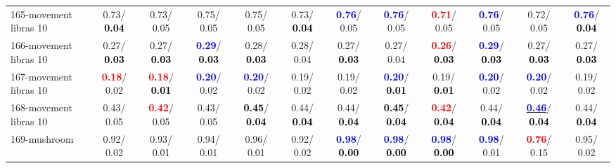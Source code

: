 \begin{table}[h]
\begin{center}
{\begin{tabular}{lc|c|c|c|c|c|c|c|c|c|c}
165-movement libras 10 &   0.73/\textcolor{black}{\textbf{  0.04}} &   0.73/  0.05 &   0.75/  0.05 &   0.75/  0.05 &   0.73/\textcolor{black}{\textbf{  0.04}} & \textcolor{blue}{\textbf{  0.76}}/  0.05 & \textcolor{blue}{\textbf{  0.76}}/  0.05 & \textcolor{red}{\textbf{  0.71}}/  0.05 & \textcolor{blue}{\textbf{  0.76}}/  0.05 &   0.72/  0.05 & \textcolor{blue}{\textbf{  0.76}}/\textcolor{black}{\textbf{  0.04}} \\
166-movement libras 10 &   0.27/\textcolor{black}{\textbf{  0.03}} &   0.27/\textcolor{black}{\textbf{  0.03}} & \textcolor{blue}{\textbf{  0.29}}/\textcolor{black}{\textbf{  0.03}} &   0.28/\textcolor{black}{\textbf{  0.03}} &   0.28/  0.04 &   0.27/\textcolor{black}{\textbf{  0.03}} &   0.27/  0.04 & \textcolor{red}{\textbf{  0.26}}/\textcolor{black}{\textbf{  0.03}} & \textcolor{blue}{\textbf{  0.29}}/\textcolor{black}{\textbf{  0.03}} &   0.27/\textcolor{black}{\textbf{  0.03}} &   0.27/\textcolor{black}{\textbf{  0.03}} \\
167-movement libras 10 & \textcolor{red}{\textbf{  0.18}}/  0.02 & \textcolor{red}{\textbf{  0.18}}/\textcolor{black}{\textbf{  0.01}} & \textcolor{blue}{\textbf{  0.20}}/  0.02 & \textcolor{blue}{\textbf{  0.20}}/  0.02 &   0.19/  0.02 &   0.19/  0.02 & \textcolor{blue}{\textbf{  0.20}}/\textcolor{black}{\textbf{  0.01}} &   0.19/\textcolor{black}{\textbf{  0.01}} & \textcolor{blue}{\textbf{  0.20}}/  0.02 & \textcolor{blue}{\textbf{  0.20}}/  0.02 &   0.19/  0.02 \\ \hline
168-movement libras 10 &   0.43/  0.05 & \textcolor{red}{\textbf{  0.42}}/  0.05 &   0.43/  0.05 & \textcolor{black}{\textbf{  0.45}}/\textcolor{black}{\textbf{  0.04}} &   0.44/\textcolor{black}{\textbf{  0.04}} &   0.44/\textcolor{black}{\textbf{  0.04}} & \textcolor{black}{\textbf{  0.45}}/\textcolor{black}{\textbf{  0.04}} & \textcolor{red}{\textbf{  0.42}}/\textcolor{black}{\textbf{  0.04}} &   0.44/\textcolor{black}{\textbf{  0.04}} & \underline{\textcolor{blue}{\textbf{  0.46}}}/\textcolor{black}{\textbf{  0.04}} &   0.44/\textcolor{black}{\textbf{  0.04}} \\
169-mushroom &   0.92/  0.02 &   0.93/  0.01 &   0.94/  0.01 &   0.96/  0.01 &   0.92/  0.02 & \textcolor{blue}{\textbf{  0.98}}/\textcolor{black}{\textbf{  0.00}} & \textcolor{blue}{\textbf{  0.98}}/\textcolor{black}{\textbf{  0.00}} & \textcolor{blue}{\textbf{  0.98}}/\textcolor{black}{\textbf{  0.00}} & \textcolor{blue}{\textbf{  0.98}}/  0.01 & \textcolor{red}{\textbf{  0.76}}/  0.15 &   0.95/  0.02 \\

\end{tabular}}
\end{center}
\end{table}
